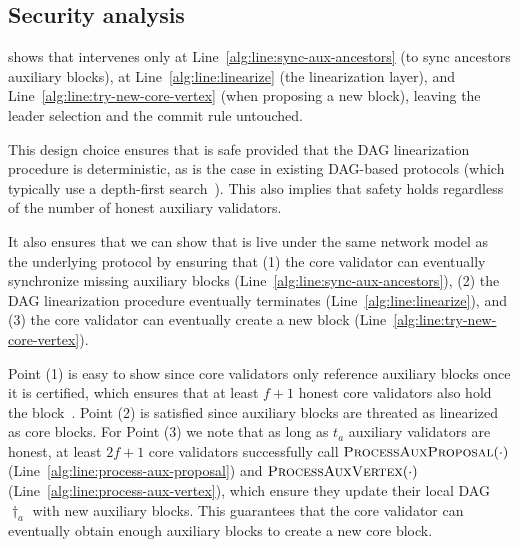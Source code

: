\subsection{Security analysis} \label{sec:security}
 shows that \sysname intervenes only at Line~\ref{alg:line:sync-aux-ancestors} (to sync ancestors auxiliary blocks), at Line~\ref{alg:line:linearize} (the linearization layer), and Line~\ref{alg:line:try-new-core-vertex} (when proposing a new block), leaving the leader selection and the commit rule untouched.

This design choice ensures that \sysname is safe provided that the DAG linearization procedure is deterministic, as is the case in existing DAG-based protocols (which typically use a depth-first search~\cite{dag-rider}). This also implies that safety holds regardless of the number of honest auxiliary validators.

It also ensures that we can show that \sysname is live under the same network model as the underlying protocol by ensuring that (1) the core validator can eventually synchronize missing auxiliary blocks (Line~\ref{alg:line:sync-aux-ancestors}), (2) the DAG linearization procedure eventually terminates (Line~\ref{alg:line:linearize}), and (3) the core validator can eventually create a new block (Line~\ref{alg:line:try-new-core-vertex}).

Point (1) is easy to show since core validators only reference auxiliary blocks once it is certified, which ensures that at least $f+1$ honest core validators also hold the block~\cite{cachin2011introduction}. Point (2) is satisfied since auxiliary blocks are threated as linearized as core blocks. For Point (3) we note that as long as $t_a$ auxiliary validators are honest, at least $2f+1$ core validators successfully call $\Call{ProcessAuxProposal}{\cdot}$ (Line~\ref{alg:line:process-aux-proposal}) and $\Call{ProcessAuxVertex}{\cdot}$ (Line~\ref{alg:line:process-aux-vertex}), which ensure they update their local DAG $\dag_a$ with new auxiliary blocks. This guarantees that the core validator can eventually obtain enough auxiliary blocks to create a new core block.